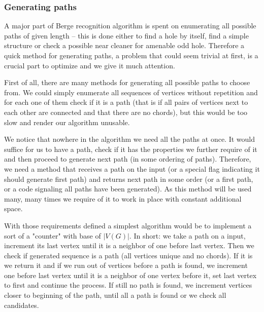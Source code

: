 

\subsubsection{Generating paths}

A major part of Berge recognition algorithm is spent on enumerating all possible paths of given length -- this is done either to find a hole by itself, find a simple structure or check a possible near cleaner for amenable odd hole. Therefore a quick method for generating paths, a problem that could seem trivial at first, is a crucial part to optimize and we give it much attention.

First of all, there are many methods for generating all possible paths to choose from. We could simply enumerate all sequences of vertices without repetition and for each one of them check if it is a path (that is if all pairs of vertices next to each other are connected and that there are no chords), but this would be too slow and render our algorithm unusable.

We notice that nowhere in the algorithm we need all the paths at once. It would suffice for us to have a path, check if it has the properties we further require of it and then proceed to generate next path (in some ordering of paths). Therefore, we need a method that receives a path on the input (or a special flag indicating it should generate first path) and returns next path in some order (or a first path, or a code signaling all paths have been generated). As this method will be used many, many times we require of it to work in place with constant additional space.

With those requirements defined a simplest algorithm would be to implement a sort of a "counter" with base of $|V(G)|$. In short: we take a path on a input, increment its last vertex until it is a neighbor of one before last vertex. Then we check if generated sequence is a path (all vertices unique and no chords). If it is we return it and if we run out of vertices before a path is found, we increment one before last vertex until it is a neighbor of one vertex before it, set last vertex to first and continue the process. If still no path is found, we increment vertices closer to beginning of the path, until all a path is found or we check all candidates.

